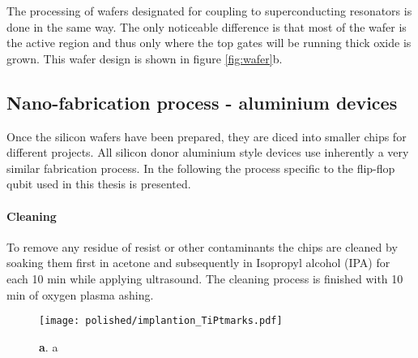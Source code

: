 The processing of wafers designated for coupling to superconducting resonators is done in the same way. The only noticeable difference is that most of the wafer is the active region and thus only where the top gates will be running thick oxide is grown. This wafer design is shown in figure \ref{fig:wafer}b. 


\subsection{Nano-fabrication process - aluminium devices}

Once the silicon wafers have been prepared, they are diced into smaller chips for different projects. All silicon donor aluminium style devices use inherently a very similar fabrication process. In the following the process specific to the flip-flop qubit used in this thesis is presented. 
\paragraph*{Cleaning}
To remove any residue of resist or other contaminants the chips are cleaned by soaking them first in acetone and subsequently in Isopropyl alcohol (IPA) for each 10 min while applying ultrasound. The cleaning process is finished with 10 min of oxygen plasma ashing. 

\begin{figure}
	\centering
	\texttt{[image: polished/implantion\_TiPtmarks.pdf]}
	\caption[TiPt]{\textbf{a}. a }
	\label{fig:TiPtmarks_impl}
\end{figure}

